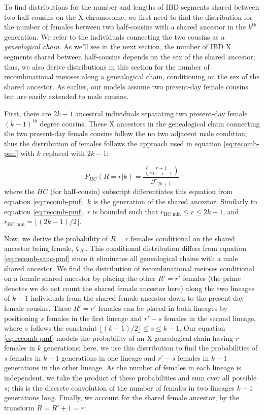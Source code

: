 \documentclass[9pt,twocolumn,twoside]{gsajnl}
\newcommand{\fsxa}{\venus_X}
\begin{document}
To find distributions for the number and lengths of IBD segments shared between
two half-cousins on the X chromosome, we first need to find the distribution
for the number of females between two half-cousins with a shared ancestor in
the $k^\text{th}$ generation. We refer to the individuals connecting the two
cousins as a \emph{genealogical chain}. As we'll see in the next section, the
number of IBD X segments shared between half-cousins depends on the sex of the
shared ancestor; thus, we also derive distributions in this section for the
number of recombinational meioses along a genealogical chain, conditioning on
the sex of the shared ancestor. As earlier, our models assume two present-day
female cousins but are easily extended to male cousins.

First, there are $2k-1$ ancestral individuals separating two present-day female
$(k-1)^\text{th}$ degree cousins. These X ancestors in the genealogical chain
connecting the two present-day female cousins follow the no two adjacent male
condition; thus the distribution of females follows the approach used in
equation \eqref{eq:recomb-pmf} with $k$ replaced with $2k-1$:

\begin{equation} \label{eq:recomb-sanc-pmf} P_{HC}(R=r | k) = \frac{ {r+1
\choose 2k-r-1} }{\mathcal{F}_{2k+1}} \end{equation}
%
where the $HC$ (for half-cousin) subscript differentiates this equation from
equation \eqref{eq:recomb-pmf}, $k$ is the generation of the shared ancestor.
Similarly to equation \eqref{eq:recomb-pmf}, $r$ is bounded such that
$r_\text{HC min} \le r \le 2k - 1$, and $r_\text{HC min} = \lfloor (2k-1)/2
\rfloor$.


Now, we derive the probability of $R=r$ females conditional on the shared
ancestor being female, $\fsxa$. This conditional distribution differs from
equation \eqref{eq:recomb-sanc-pmf} since it eliminates all genealogical chains
with a male shared ancestor. We find the distribution of recombinational
meioses conditional on a female shared ancestor by placing the other $R'=r'$
females (the prime denotes we do not count the shared female ancestor here)
along the two lineages of $k-1$ individuals from the shared female ancestor
down to the present-day female cousins. These $R'=r'$ females can be placed in
both lineages by positioning $s$ females in the first lineage and $r'-s$
females in the second lineage, where $s$ follows the constraint $\lfloor
(k-1)/2 \rfloor \le s \le k-1$.  Our equation \eqref{eq:recomb-pmf} models the
probability of an X genealogical chain having $r$ females in $k$ generations;
here, we use this distribution to find the probabilities of $s$ females in
$k-1$ generations in one lineage and $r'-s$ females in $k-1$ generations in the
other lineage. As the number of females in each lineage is independent, we take
the product of these probabilities and sum over all possible $s$; this is the
discrete convolution of the number of females in two lineages $k-1$ generations
long.  Finally, we account for the shared female ancestor, by the transform $R
= R' + 1 = r$:
\end{document}
